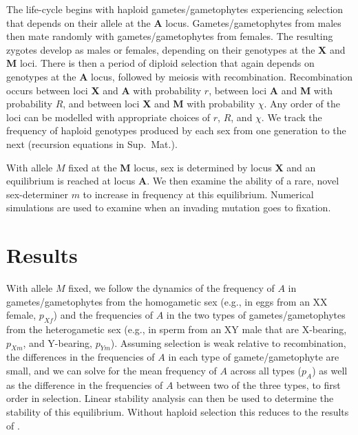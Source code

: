 \documentclass[12pt]{article}
\begin{document}
The life-cycle begins with haploid gametes/gametophytes experiencing selection that depends on their allele at the \textbf{A} locus.
Gametes/gametophytes from males then mate randomly with gametes/gametophytes from females.
The resulting zygotes develop as males or females, depending on their genotypes at the \textbf{X} and \textbf{M} loci.
There is then a period of diploid selection that again depends on genotypes at the \textbf{A} locus, followed by meiosis with recombination. 
Recombination occurs between loci \textbf{X} and \textbf{A} with probability $r$, between loci \textbf{A} and \textbf{M} with probability $R$, and between loci \textbf{X} and \textbf{M} with probability $\chi$. %
Any order of the loci can be modelled with appropriate choices of $r$, $R$, and $\chi$.
We track the frequency of haploid genotypes produced by each sex from one generation to the next (recursion equations in Sup.\ Mat.).

With allele $M$ fixed at the \textbf{M} locus, sex is determined by locus \textbf{X} and an equilibrium is reached at locus \textbf{A}. %
We then examine the ability of a rare, novel sex-determiner $m$ to increase in frequency at this equilibrium.
Numerical simulations are used to examine when an invading mutation goes to fixation.

\section*{Results}

With allele $M$ fixed, we follow the dynamics of the frequency of $A$ in gametes/gametophytes from the homogametic sex (e.g., in eggs from an XX female, $p_{Xf}$) and the frequencies of $A$ in the two types of gametes/gametophytes from the heterogametic sex (e.g., in sperm from an XY male that are X-bearing, $p_{Xm}$, and Y-bearing, $p_{Ym}$).
Assuming selection is weak relative to recombination, the differences in the frequencies of $A$ in each type of gamete/gametophyte are small, and we can solve for the mean frequency of $A$ across all types ($p_A$) as well as the difference in the frequencies of $A$ between two of the three types, to first order in selection.
Linear stability analysis can then be used to determine the stability of this equilibrium.
Without haploid selection this reduces to the results of \citep{vanDoorn:2010hu}.
\end{document}
